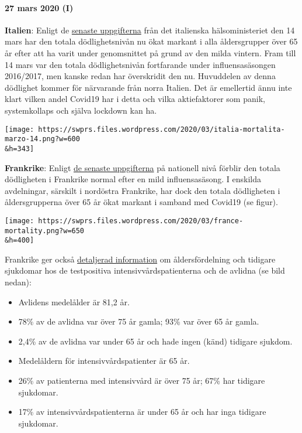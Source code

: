 \hypertarget{27-mars-2020-i}{%
\paragraph{27 mars 2020 (I)}\label{27-mars-2020-i}}

\textbf{Italien}: Enligt de
\href{http://www.salute.gov.it/portale/caldo/SISMG_sintesi_ULTIMO.pdf}{senaste
uppgifterna} från det italienska hälsoministeriet den 14 mars har den
totala dödlighetsnivån nu ökat markant i alla åldersgrupper över 65 år
efter att ha varit under genomsnittet på grund av den milda vintern.
Fram till 14 mars var den totala dödlighetsnivån fortfarande under
influensasäsongen 2016/2017, men kanske redan har överskridit den nu.
Huvuddelen av denna dödlighet kommer för närvarande från norra Italien.
Det är emellertid ännu inte klart vilken andel Covid19 har i detta och
vilka aktiefaktorer som panik, systemkollaps och själva lockdown kan ha.

\texttt{[image: https://swprs.files.wordpress.com/2020/03/italia-mortalita-marzo-14.png?w=600\\\&h=343]}

\textbf{Frankrike}: Enligt
\href{https://www.santepubliquefrance.fr/maladies-et-traumatismes/maladies-et-infections-respiratoires/infection-a-coronavirus/documents/bulletin-national/covid-19-point-epidemiologique-du-24-mars-2020}{de
senaste uppgifterna} på nationell nivå förblir den totala dödligheten i
Frankrike normal efter en mild influensasäsong. I enskilda avdelningar,
särskilt i nordöstra Frankrike, har dock den totala dödligheten i
åldersgrupperna över 65 år ökat markant i samband med Covid19 (se
figur).

\texttt{[image: https://swprs.files.wordpress.com/2020/03/france-mortality.png?w=650\\\&h=400]}

Frankrike ger också
\href{https://www.santepubliquefrance.fr/maladies-et-traumatismes/maladies-et-infections-respiratoires/infection-a-coronavirus/documents/bulletin-national/covid-19-point-epidemiologique-du-24-mars-2020}{detaljerad
information} om åldersfördelning och tidigare sjukdomar hos de
testpositiva intensivvårdspatienterna och de avlidna (se bild nedan):

\begin{itemize}
\tightlist
\item
  Avlidens medelålder är 81,2 år.
\item
  78\% av de avlidna var över 75 år gamla; 93\% var över 65 år gamla.
\item
  2,4\% av de avlidna var under 65 år och hade ingen (känd) tidigare
  sjukdom.
\item
  Medelåldern för intensivvårdspatienter är 65 år.
\item
  26\% av patienterna med intensivvård är över 75 år; 67\% har tidigare
  sjukdomar.
\item
  17\% av intensivvårdspatienterna är under 65 år och har inga tidigare
  sjukdomar.
\end{itemize}

